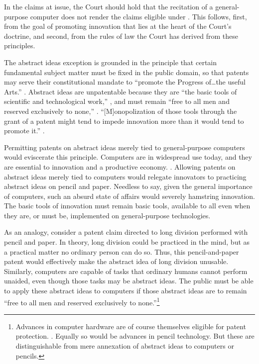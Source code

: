 \documentclass{scotus}
\begin{document}
In the claims at issue, the Court should hold that the recitation of a
general-purpose computer does not render the claims eligible under .
This follows, first, from the goal of promoting innovation that lies at the
heart of
the Court's  doctrine, and second, from the rules of law
the Court has derived from these principles.

The abstract ideas exception is grounded in the principle that certain
fundamental subject matter must be fixed in the public domain, so that
patents may serve their constitutional mandate to ``promote the Progress
of\ldots the useful Arts.'' .
Abstract ideas are unpatentable because they
are ``the basic tools of scientific and technological work,'' , and must remain ``free to all men and reserved exclusively to none,''
. ``[M]onopolization
of those tools through the grant of a patent might tend to impede innovation
more than it would tend to promote it.'' .

Permitting patents on abstract ideas merely tied to general-purpose computers
would eviscerate this principle.
Computers are in
widespread use today, and they are essential to innovation and a productive
economy. . 
Allowing patents on abstract ideas merely tied to computers
would relegate
innovators to practicing abstract ideas on pencil and
paper. Needless to say, given the general importance of computers, such an
absurd state of affairs would severely hamstring innovation.
The basic tools of innovation must remain basic tools, available to all even
when they are, or must be, implemented on general-purpose technologies.

As an analogy, consider a patent claim directed to long division performed with
pencil and paper. In theory, long division could be practiced in the mind, but
as a practical matter no ordinary person can do so. Thus, this pencil-and-paper
patent would effectively make the abstract idea of long division unusable.
Similarly, computers are capable of tasks that ordinary
humans cannot perform unaided, even though those tasks may be
abstract ideas. The public must be able to apply these abstract ideas to
computers if those abstract ideas are to
remain ``free to all men and reserved exclusively to none.''\footnote{%
Advances in computer hardware are of course themselves eligible for patent
protection.  . Equally so would be advances in pencil technology. But these are
distinguishable from mere annexation of abstract ideas to computers or pencils.}
\end{document}
